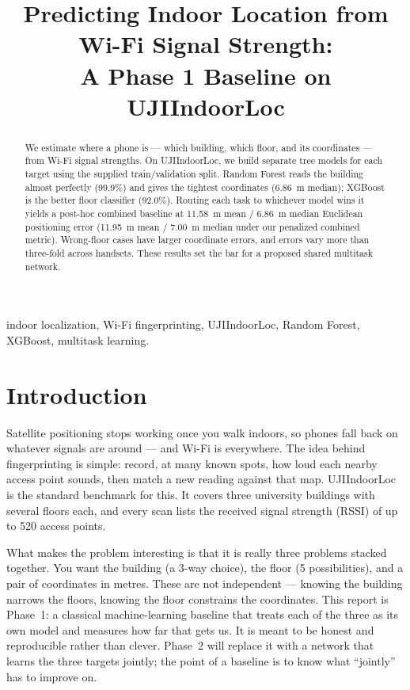 \documentclass[conference]{IEEEtran}
\begin{document}
\title{Predicting Indoor Location from Wi-Fi Signal Strength:\\
A Phase 1 Baseline on UJIIndoorLoc}

\author{
}

\maketitle

\begin{abstract}
We estimate where a phone is --- which building, which floor, and its coordinates --- from Wi-Fi signal strengths. On UJIIndoorLoc, we build separate tree models for each target using the supplied train/validation split. Random Forest reads the building almost perfectly (99.9\%) and gives the tightest coordinates (6.86~m median); XGBoost is the better floor classifier (92.0\%). Routing each task to whichever model wins it yields a post-hoc combined baseline at 11.58~m mean / 6.86~m median Euclidean positioning error (11.95~m mean / 7.00~m median under our penalized combined metric). Wrong-floor cases have larger coordinate errors, and errors vary more than three-fold across handsets. These results set the bar for a proposed shared multitask network.
\end{abstract}

\begin{IEEEkeywords}
indoor localization, Wi-Fi fingerprinting, UJIIndoorLoc, Random Forest, XGBoost, multitask learning.
\end{IEEEkeywords}

\section{Introduction}
Satellite positioning stops working once you walk indoors, so phones fall back
on whatever signals are around --- and Wi-Fi is everywhere. The idea behind
fingerprinting is simple: record, at many known spots, how loud each nearby
access point sounds, then match a new reading against that map. UJIIndoorLoc is
the standard benchmark for this. It covers three university buildings with
several floors each, and every scan lists the received signal strength (RSSI)
of up to 520 access points.

What makes the problem interesting is that it is really three problems stacked
together. You want the building (a 3-way choice), the floor (5 possibilities),
and a pair of coordinates in metres. These are not independent --- knowing the
building narrows the floors, knowing the floor constrains the coordinates. This
report is Phase~1: a classical machine-learning baseline that treats each of
the three as its own model and measures how far that gets us. It is meant to be
honest and reproducible rather than clever. Phase~2 will replace it with a
network that learns the three targets jointly; the point of a baseline is to
know what ``jointly'' has to improve on.
\end{document}
